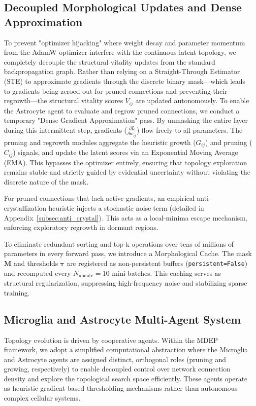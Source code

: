 \documentclass[letterpaper]{article} %
\begin{document}
\subsection{Decoupled Morphological Updates and Dense Approximation}
To prevent "optimizer hijacking" where weight decay and parameter momentum from the AdamW optimizer interfere with the continuous latent topology, we completely decouple the structural vitality updates from the standard backpropagation graph. Rather than relying on a Straight-Through Estimator (STE) to approximate gradients through the discrete binary mask—which leads to gradients being zeroed out for pruned connections and preventing their regrowth—the structural vitality scores $V_{ij}$ are updated autonomously. To enable the Astrocyte agent to evaluate and regrow pruned connections, we conduct a temporary "Dense Gradient Approximation" pass. By unmasking the entire layer during this intermittent step, gradients ($\frac{\partial L}{\partial w_{ij}}$) flow freely to all parameters. The pruning and regrowth modules aggregate the heuristic growth ($G_{ij}$) and pruning ($C_{ij}$) signals, and update the latent scores via an Exponential Moving Average (EMA). This bypasses the optimizer entirely, ensuring that topology exploration remains stable and strictly guided by evidential uncertainty without violating the discrete nature of the mask.

For pruned connections that lack active gradients, an empirical anti-crystallization heuristic injects a stochastic noise term (detailed in Appendix~\ref{subsec:anti_crystal}). This acts as a local-minima escape mechanism, enforcing exploratory regrowth in dormant regions.

To eliminate redundant sorting and top-k operations over tens of millions of parameters in every forward pass, we introduce a Morphological Cache. The mask $\bm{M}$ and thresholds $\bm{\tau}$ are registered as non-persistent buffers (\texttt{persistent=False}) and recomputed every $N_{\text{update}} = 10$ mini-batches. This caching serves as structural regularization, suppressing high-frequency noise and stabilizing sparse training.

\subsection{Microglia and Astrocyte Multi-Agent System}
Topology evolution is driven by cooperative agents. Within the MDEP framework, we adopt a simplified computational abstraction where the Microglia and Astrocyte agents are assigned distinct, orthogonal roles (pruning and growing, respectively) to enable decoupled control over network connection density and explore the topological search space efficiently. These agents operate as heuristic gradient-based thresholding mechanisms rather than autonomous complex cellular systems.
\end{document}
